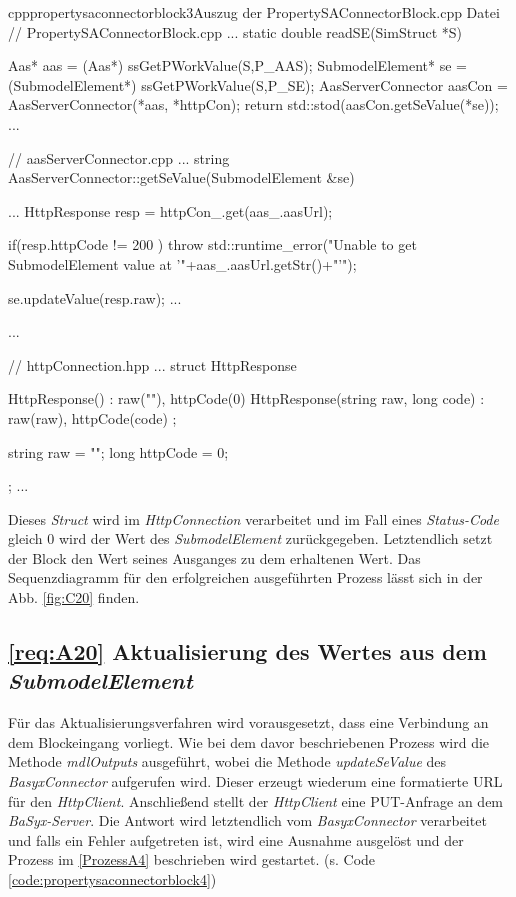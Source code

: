 \begin{codeblock}{cpp}{propertysaconnectorblock3}{Auszug der PropertySAConnectorBlock.cpp Datei}
    // PropertySAConnectorBlock.cpp
    ...
    static double readSE(SimStruct *S){
    {    
        Aas* aas = (Aas*) ssGetPWorkValue(S,P_AAS);
        SubmodelElement* se =(SubmodelElement*) ssGetPWorkValue(S,P_SE);
        AasServerConnector aasCon = AasServerConnector(*aas, *httpCon);
        return  std::stod(aasCon.getSeValue(*se));
    }
    ...

    // aasServerConnector.cpp
    ...
    string AasServerConnector::getSeValue(SubmodelElement &se)
    {
        ...
        HttpResponse resp = httpCon_.get(aas_.aasUrl);
        
        if(resp.httpCode != 200 )
            throw std::runtime_error("Unable to get SubmodelElement value at '"+aas_.aasUrl.getStr()+"'");

        se.updateValue(resp.raw);
        ...
    }
    ...

    // httpConnection.hpp
    ...
    struct HttpResponse{
        HttpResponse() : raw(""), httpCode(0) {}
        HttpResponse(string raw, long code) : raw(raw), httpCode(code) {};
        
        string raw = ""; 
        long httpCode = 0;
    };
    ...
}
\end{codeblock}


Dieses \textit{Struct} wird im \textit{HttpConnection} verarbeitet und im Fall eines \textit{Status-Code} gleich 0 wird der Wert des \textit{SubmodelElement} zurückgegeben. Letztendlich setzt der Block den Wert seines Ausganges zu dem erhaltenen Wert. Das Sequenzdiagramm für den erfolgreichen ausgeführten Prozess lässt sich in der Abb. \ref{fig:C20} finden.


\subsection{\ref{req:A20} Aktualisierung des Wertes aus dem \textit{SubmodelElement}}
Für das Aktualisierungsverfahren wird vorausgesetzt, dass eine Verbindung an dem Blockeingang vorliegt. Wie bei dem davor beschriebenen Prozess wird die Methode \textit{mdlOutputs} ausgeführt, wobei die Methode \textit{updateSeValue} des \textit{BasyxConnector} aufgerufen wird. Dieser erzeugt wiederum eine formatierte URL für den \textit{HttpClient}. Anschließend stellt der \textit{HttpClient} eine PUT-Anfrage an dem \textit{BaSyx-Server}. Die Antwort wird letztendlich vom \textit{BasyxConnector} verarbeitet und falls ein Fehler aufgetreten ist, wird eine Ausnahme ausgelöst und der Prozess im \ref{ProzessA4} beschrieben wird gestartet. (s. Code \ref{code:propertysaconnectorblock4})


